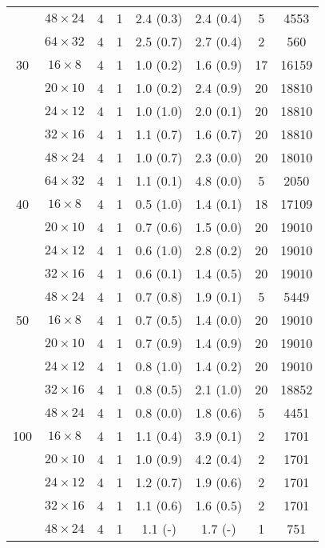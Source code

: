 \begin{longtable}{cccccccc}
    & $48 \times  24$ &  4 & 1 & 2.4 \; (0.3) & 2.4 \; (0.4) & 5 & 4553 \\
    & $64 \times  32$ &  4 & 1 & 2.5 \; (0.7) & 2.7 \; (0.4) & 2 & 560 \\
\midrule
 30 & $16 \times   8$ &  4 & 1 & 1.0 \; (0.2) & 1.6 \; (0.9) & 17 & 16159 \\
    & $20 \times  10$ &  4 & 1 & 1.0 \; (0.2) & 2.4 \; (0.9) & 20 & 18810 \\
    & $24 \times  12$ &  4 & 1 & 1.0 \; (1.0) & 2.0 \; (0.1) & 20 & 18810 \\
    & $32 \times  16$ &  4 & 1 & 1.1 \; (0.7) & 1.6 \; (0.7) & 20 & 18810 \\
    & $48 \times  24$ &  4 & 1 & 1.0 \; (0.7) & 2.3 \; (0.0) & 20 & 18010 \\
    & $64 \times  32$ &  4 & 1 & 1.1 \; (0.1) & 4.8 \; (0.0) & 5 & 2050 \\
\midrule
 40 & $16 \times   8$ &  4 & 1 & 0.5 \; (1.0) & 1.4 \; (0.1) & 18 & 17109 \\
    & $20 \times  10$ &  4 & 1 & 0.7 \; (0.6) & 1.5 \; (0.0) & 20 & 19010 \\
    & $24 \times  12$ &  4 & 1 & 0.6 \; (1.0) & 2.8 \; (0.2) & 20 & 19010 \\
    & $32 \times  16$ &  4 & 1 & 0.6 \; (0.1) & 1.4 \; (0.5) & 20 & 19010 \\
    & $48 \times  24$ &  4 & 1 & 0.7 \; (0.8) & 1.9 \; (0.1) & 5 & 5449 \\
\midrule
 50 & $16 \times   8$ &  4 & 1 & 0.7 \; (0.5) & 1.4 \; (0.0) & 20 & 19010 \\
    & $20 \times  10$ &  4 & 1 & 0.7 \; (0.9) & 1.4 \; (0.9) & 20 & 19010 \\
    & $24 \times  12$ &  4 & 1 & 0.8 \; (1.0) & 1.4 \; (0.2) & 20 & 19010 \\
    & $32 \times  16$ &  4 & 1 & 0.8 \; (0.5) & 2.1 \; (1.0) & 20 & 18852 \\
    & $48 \times  24$ &  4 & 1 & 0.8 \; (0.0) & 1.8 \; (0.6) & 5 & 4451 \\
\midrule
100 & $16 \times   8$ &  4 & 1 & 1.1 \; (0.4) & 3.9 \; (0.1) & 2 & 1701 \\
    & $20 \times  10$ &  4 & 1 & 1.0 \; (0.9) & 4.2 \; (0.4) & 2 & 1701 \\
    & $24 \times  12$ &  4 & 1 & 1.2 \; (0.7) & 1.9 \; (0.6) & 2 & 1701 \\
    & $32 \times  16$ &  4 & 1 & 1.1 \; (0.6) & 1.6 \; (0.5) & 2 & 1701 \\
    & $48 \times  24$ &  4 & 1 & 1.1 \; (-) & 1.7 \; (-) & 1 & 751 \\

\end{longtable}
